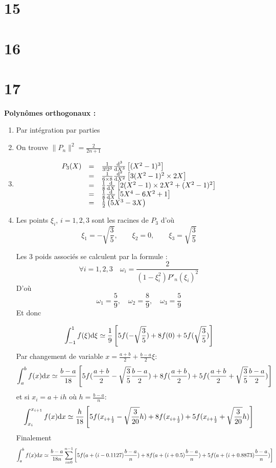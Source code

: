 \documentclass[a4paper]{article}
\def \de {{\rm d}}
\begin{document}
\section*{15}
\section*{16}




\section*{17}{\bf Polynômes orthogonaux : }
\begin{enumerate}
\item Par intégration par parties
\item On trouve $\|P_n\|^2=\frac{2}{2n+1}$
\item \[\begin{array}{ccl}
P_3(X)&=&\frac{1}{3!2^3}\frac{\de^3}{\de X^3}\left[(X^2-1)^3\right]\\
&=&\frac{1}{6\times 8}\frac{\de^2}{\de X^2}\left[3(X^2-1)^2\times 2X\right]\\
&=&\frac{1}{8}\frac{\de}{\de X}\left[2(X^2-1)\times 2X^2+(X^2-1)^2\right]\\
&=&\frac{1}{8}\frac{\de}{\de X}\left[5X^4-6X^2+1\right]\\
&=&\frac{1}{2}\left(5X^3-3X\right)
\end{array}
\]
\item Les points $\xi_i$, $i=1,2,3$ sont les racines de $P_3$ d'où 
\[\xi_1=-\sqrt{\frac{3}{5}}, \qquad \xi_2=0, \qquad  \xi_3=\sqrt{\frac{3}{5}}\]

 Les 3 poids  associés se calculent par la formule :
 \[\forall i =1,2,3 \quad \omega_i=\frac{2}{(1-\xi_i^2)P'_n(\xi_i)^2}\]
 D'où
 \[\omega_1 = \frac 59,\quad  \omega_2 = \frac 89,\quad  \omega_3 = \frac 59\]
Et donc

\[\int_{-1}^1f(\xi)\de \xi \simeq  \frac 19\left[5f(-\sqrt{\frac{3}{5}})+ 8f(0)+ 5f(\sqrt{\frac{3}{5}})\right]\]
Par changement de variable $x=\frac{a+b}{2}+\frac{b-a}{2}\xi$:
\[\int_a^bf(x)\de x \simeq  \frac{b-a}{18}\left[5f(\frac{a+b}{2}-\sqrt{\frac{3}{5}}\frac{b-a}{2})+ 8f(\frac{a+b}{2})+ 5f(\frac{a+b}{2}+\sqrt{\frac{3}{5}}\frac{b-a}{2})\right]\]
et si $x_i=a+ih$ où $h=\frac{b-a}{n}$:
\[\int_{x_i}^{x_{i+1}}f(x)\de x \simeq  \frac{h}{18}\left[5f(x_{i+\frac{1}{2}}-\sqrt{\frac{3}{20}}h)+ 8f(x_{i+\frac{1}{2}})+ 5f(x_{i+\frac{1}{2}}+\sqrt{\frac{3}{20}}h)\right]\]
Finalement
\[\int_a^bf(x)\de x \simeq  \frac{b-a}{18 n}\sum_{i=0}^{n-1}\left[5f(a+(i-0.1127)\frac{b-a}{n})+ 8f(a+(i+0.5)\frac{b-a}{n})+ 5f(a+(i+0.8873)\frac{b-a}{n})\right]\]
\end{enumerate}
\end{document}
